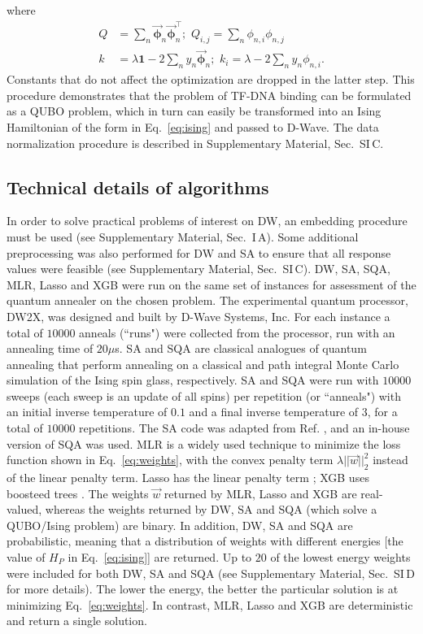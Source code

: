 \documentclass[aps,pra,groupedaddress,nofootinbib,notitlepage,showpacs,floatfix,superscriptaddress]{revtex4-1}
\begin{document}
where
\begin{align}
Q &= \sum_n \vec{\bm{\phi}}_n\vec{\bm{\phi}}_n^\intercal; \,\, Q_{i,j} = \sum_n \phi_{n,i}\phi_{n,j} \label{eq:hJ} \\
k &= \lambda\mathbf{1} -2\sum_ny_n\vec{\bm{\phi}}_n;\,\, k_i = \lambda - 2\sum_ny_n\phi_{n,i}. \nonumber
\end{align}
Constants that do not affect the optimization are dropped in the latter step. This procedure demonstrates that the problem of TF-DNA binding can be formulated as a QUBO problem, which in turn can easily be transformed into an Ising Hamiltonian of the form in Eq.~\eqref{eq:ising} and passed to D-Wave. The data normalization procedure is described in Supplementary Material, Sec.~SI\,C.

\subsection*{Technical details of algorithms}
In order to solve practical problems of interest on DW, an embedding procedure must be used (see Supplementary Material, Sec.~I\,A). Some additional preprocessing was also performed for DW and SA to ensure that all response values were feasible (see Supplementary Material, Sec.~SI\,C). 
DW, SA, SQA, MLR, Lasso and XGB were run on the same set of instances for assessment of the quantum annealer on the chosen problem. The experimental quantum processor, DW2X, was designed and built by D-Wave Systems, Inc. For each instance a total of $10000$ anneals (``runs") were collected from the processor, run with an annealing time of $20\mu$s. SA and SQA are classical analogues of quantum annealing that perform annealing on a classical and path integral Monte Carlo simulation of the Ising spin glass, respectively. SA and SQA were run with $10000$ sweeps (each sweep is an update of all spins) per repetition (or ``anneals") with an initial inverse temperature of $0.1$ and a final inverse temperature of $3$, for a total of $10000$ repetitions. The SA code was adapted from Ref. \cite{Isakov-SA:14}, and an in-house version of SQA was used. MLR is a widely used technique to minimize the loss function shown in Eq.~\eqref{eq:weights}, with the convex penalty term $\lambda ||\vec{w}||_2^2$ instead of the linear penalty term. Lasso has the linear penalty term \cite{Tibshirani:96}; XGB uses boosteed trees \cite{Chen:16}. The weights $\vec{w}$ returned by MLR, Lasso and XGB are real-valued, whereas the weights returned by DW, SA and SQA (which solve a QUBO/Ising problem) are binary. In addition, DW, SA and SQA are probabilistic, meaning that a distribution of weights with different energies [the value of $H_P$ in Eq.~\eqref{eq:ising}] are returned. Up to $20$ of the lowest energy weights were included for both DW, SA and SQA (see Supplementary Material, Sec.~SI\,D for more details). The lower the energy, the better the particular solution is at minimizing Eq.~\eqref{eq:weights}. In contrast, MLR, Lasso and XGB are deterministic and return a single solution. 
\end{document}
